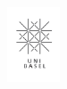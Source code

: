 \documentclass[portrait,final,paperwidth=31truein,paperheight=38truein,fontscale=0.35, margin=1truein]{baposter}
\begin{document}
\begin{poster}
  {%
    \includegraphics[height=6.0em]{images/logo}
  }




\end{poster}
\end{document}
